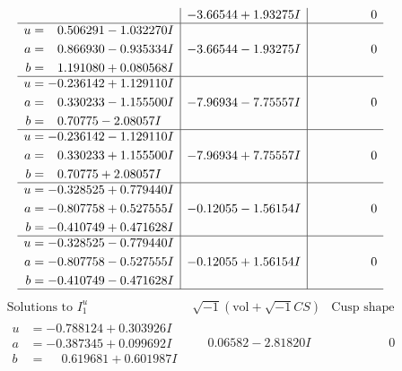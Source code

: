 \documentclass[1p]{elsarticle_modified}
\theoremstyle{definition}
\newcommand{\I}{\sqrt{-1}}
\begin{document}
$$\begin{array}{c|c|c}
 & -3.66544 + 1.93275 I & \phantom{-0.000000 } 0 \\ \hline\begin{aligned}
u &= \phantom{-}0.506291 - 1.032270 I \\
a &= \phantom{-}0.866930 - 0.935334 I \\
b &= \phantom{-}1.191080 + 0.080568 I\end{aligned}
 & -3.66544 - 1.93275 I & \phantom{-0.000000 } 0 \\ \hline\begin{aligned}
u &= -0.236142 + 1.129110 I \\
a &= \phantom{-}0.330233 - 1.155500 I \\
b &= \phantom{-}0.70775 - 2.08057 I\end{aligned}
 & -7.96934 - 7.75557 I & \phantom{-0.000000 } 0 \\ \hline\begin{aligned}
u &= -0.236142 - 1.129110 I \\
a &= \phantom{-}0.330233 + 1.155500 I \\
b &= \phantom{-}0.70775 + 2.08057 I\end{aligned}
 & -7.96934 + 7.75557 I & \phantom{-0.000000 } 0 \\ \hline\begin{aligned}
u &= -0.328525 + 0.779440 I \\
a &= -0.807758 + 0.527555 I \\
b &= -0.410749 + 0.471628 I\end{aligned}
 & -0.12055 - 1.56154 I & \phantom{-0.000000 } 0 \\ \hline\begin{aligned}
u &= -0.328525 - 0.779440 I \\
a &= -0.807758 - 0.527555 I \\
b &= -0.410749 - 0.471628 I\end{aligned}
 & -0.12055 + 1.56154 I & \phantom{-0.000000 } 0\\
 \hline 
 \end{array}$$\newpage$$\begin{array}{c|c|c}  
\text{Solutions to }I^u_{1}& \I (\text{vol} + \sqrt{-1}CS) & \text{Cusp shape}\\
 \hline 
\begin{aligned}
u &= -0.788124 + 0.303926 I \\
a &= -0.387345 + 0.099692 I \\
b &= \phantom{-}0.619681 + 0.601987 I\end{aligned}
 & \phantom{-}0.06582 - 2.81820 I & \phantom{-0.000000 } 0 \\ \hline\begin{aligned}

\end{aligned}
\end{array}$$
\end{document}
